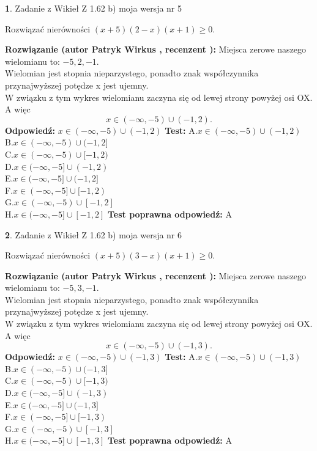 \documentclass[12pt, a4paper]{article}
\theoremstyle{definition} %
\newtheorem{zad}{}
\newcommand{\zadStart}[1]{\begin{zad}#1\newline}
\newcommand{\zadStop}{\end{zad}}
\newcommand{\rozwStart}[2]{\noindent \textbf{Rozwiązanie (autor #1 , recenzent #2): }\newline}
\newcommand{\rozwStop}{\newline}
\newcommand{\odpStart}{\noindent \textbf{Odpowiedź:}\newline}
\newcommand{\odpStop}{\newline}
\newcommand{\testStart}{\noindent \textbf{Test:}\newline}
\newcommand{\testStop}{\newline}
\newcommand{\kluczStart}{\noindent \textbf{Test poprawna odpowiedź:}\newline}
\newcommand{\kluczStop}{\newline}
\begin{document}
\zadStart{Zadanie z Wikieł Z 1.62 b) moja wersja nr 5}

Rozwiązać nierówności $(x+5)(2-x)(x+1)\ge0$.
\zadStop
\rozwStart{Patryk Wirkus}{}
Miejsca zerowe naszego wielomianu to: $-5, 2, -1$.\\
Wielomian jest stopnia nieparzystego, ponadto znak współczynnika przy\linebreak najwyższej potędze x jest ujemny.\\ W związku z tym wykres wielomianu zaczyna się od lewej strony powyżej osi OX. A więc $$x \in (-\infty,-5) \cup (-1,2).$$
\rozwStop
\odpStart
$x \in (-\infty,-5) \cup (-1,2)$
\odpStop
\testStart
A.$x \in (-\infty,-5) \cup (-1,2)$\\
B.$x \in (-\infty,-5) \cup (-1,2]$\\
C.$x \in (-\infty,-5) \cup [-1,2)$\\
D.$x \in (-\infty,-5] \cup (-1,2)$\\
E.$x \in (-\infty,-5] \cup (-1,2]$\\
F.$x \in (-\infty,-5] \cup [-1,2)$\\
G.$x \in (-\infty,-5) \cup [-1,2]$\\
H.$x \in (-\infty,-5] \cup [-1,2]$
\testStop
\kluczStart
A
\kluczStop



\zadStart{Zadanie z Wikieł Z 1.62 b) moja wersja nr 6}

Rozwiązać nierówności $(x+5)(3-x)(x+1)\ge0$.
\zadStop
\rozwStart{Patryk Wirkus}{}
Miejsca zerowe naszego wielomianu to: $-5, 3, -1$.\\
Wielomian jest stopnia nieparzystego, ponadto znak współczynnika przy\linebreak najwyższej potędze x jest ujemny.\\ W związku z tym wykres wielomianu zaczyna się od lewej strony powyżej osi OX. A więc $$x \in (-\infty,-5) \cup (-1,3).$$
\rozwStop
\odpStart
$x \in (-\infty,-5) \cup (-1,3)$
\odpStop
\testStart
A.$x \in (-\infty,-5) \cup (-1,3)$\\
B.$x \in (-\infty,-5) \cup (-1,3]$\\
C.$x \in (-\infty,-5) \cup [-1,3)$\\
D.$x \in (-\infty,-5] \cup (-1,3)$\\
E.$x \in (-\infty,-5] \cup (-1,3]$\\
F.$x \in (-\infty,-5] \cup [-1,3)$\\
G.$x \in (-\infty,-5) \cup [-1,3]$\\
H.$x \in (-\infty,-5] \cup [-1,3]$
\testStop
\kluczStart
A
\kluczStop
\end{document}
